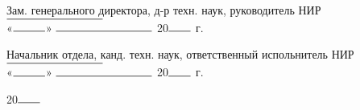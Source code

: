 \hspace{0.45\textwidth}
\begin{minipage}{0.5\textwidth}
\begin{flushleft}
\begin{singlespace}
Зам. генерального директора,  д-р техн. наук, 
руководитель НИР\\
\(\rule{3cm}{0.5pt}\) \loochNTOSVFirst \\
«\(\rule{1cm}{0.5pt}\)»   \(\rule{3cm}{0.5pt}\) 20\(\rule{0.7cm}{0.5pt}\) г.

\vspace{0.5cm}
Начальник отдела,  канд. техн. наук, 
ответственный испольнитель НИР\\
\(\rule{3cm}{0.5pt}\) \loochNTOSVSecond \\
«\(\rule{1cm}{0.5pt}\)»   \(\rule{3cm}{0.5pt}\) 20\(\rule{0.7cm}{0.5pt}\) г.
\end{singlespace}
\end{flushleft}
\end{minipage}

\vfill
\begin{center}
\loochRepLocation{} 20\(\rule{0.7cm}{0.5pt}\)
\end{center}


